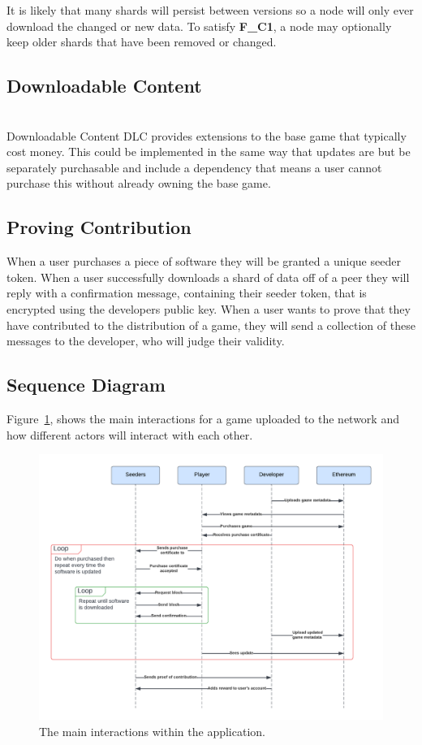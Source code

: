 \noindent It is likely that many shards will persist between versions so a node will only ever download the changed or new data. To satisfy \textbf{F\_C1}, a node may optionally keep older shards that have been removed or changed.

\subsection*{Downloadable Content}
\tbd\\\noindent
Downloadable Content DLC provides extensions to the base game that typically cost money. This could be implemented in the same way that updates are but be separately purchasable and include a dependency that means a user cannot purchase this without already owning the base game.

\subsection*{Proving Contribution}

When a user purchases a piece of software they will be granted a unique seeder token. When a user successfully downloads a shard of data off of a peer they will reply with a confirmation message, containing their seeder token, that is encrypted using the developers public key. When a user wants to prove that they have contributed to the distribution of a game, they will send a collection of these messages to the developer, who will judge their validity.

\subsection*{Sequence Diagram}

Figure~\ref{fig:sequence-diagram}, shows the main interactions for a game uploaded to the network and how different actors will interact with each other.

\begin{figure}[ht]
  \centering
  \includegraphics[width=.95\textwidth]{assets/images/diagrams/seqeunce-diagram.png}
  \caption{The main interactions within the application.}
  \label{fig:sequence-diagram}
\end{figure}